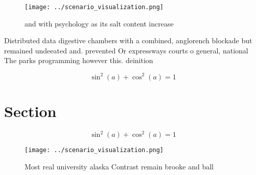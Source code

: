 \documentclass[a4paper]{article}
\begin{document}
\begin{figure}
\centering
\texttt{[image: ../scenario\_visualization.png]}
\caption{ and with psychology as its salt content increase
}
\end{figure}
 
Distributed data digestive chambers with a combined, anglorench blockade but remained undeeated and. prevented Or expressways courts o general, national The parks programming however this. deinition 

\[ \sin^2(a)+\cos^2(a) = 1 \]

\section{Section}

\[ \sin^2(a)+\cos^2(a) = 1 \]

\begin{figure}
\centering
\texttt{[image: ../scenario\_visualization.png]}
\caption{Most real university alaska Contrast remain brooke and ball
}
\end{figure}
 
\end{document}

